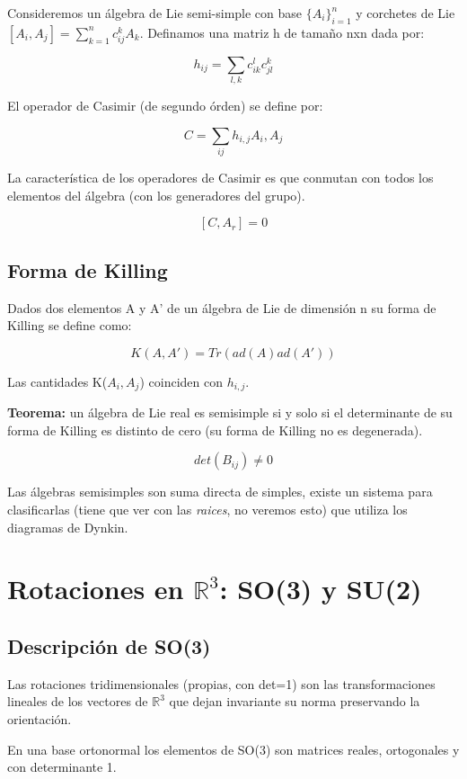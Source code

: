 \documentclass{article}
\begin{document}
      Consideremos un álgebra de Lie semi-simple con base $\lbrace A_i \rbrace _{i=1}^n$ y corchetes de Lie $[A_i,A_j]=\sum _{k=1}^n c_{ij}^k A_k$. Definamos una matriz h de tamaño nxn dada por:

      $$h_{ij}=\sum _{l,k}c^l_{ik}c^k_{jl}$$

      El operador de Casimir (de segundo órden) se define por:

      $$C=\sum _{ij}h_{i,j}A_i,A_j$$

      La característica de los operadores de Casimir es que conmutan con todos los elementos del álgebra (con los generadores del grupo).

      $$[C,A_r]=0$$

     \subsection{Forma de Killing}

     Dados dos elementos A y A' de un álgebra de Lie de dimensión n su forma de Killing se define como:

     $$K(A,A')=Tr(ad(A)ad(A'))$$

     Las cantidades K($A_i,A_j$) coinciden con $h_{i,j}$.

     \textbf{Teorema:} un álgebra de Lie real es semisimple si y solo si el determinante de su forma de Killing es distinto de cero (su forma de Killing no es degenerada).

    $$det(B_{ij})\neq 0$$

    Las álgebras semisimples son suma directa de simples, existe un sistema para clasificarlas (tiene que ver con las \textit{raices}, no veremos esto) que utiliza los diagramas de Dynkin.

     \newpage

     \section{Rotaciones en $\mathds{R}^3$: SO(3) y SU(2)}

     \subsection{Descripción de SO(3)}

     Las rotaciones tridimensionales (propias, con det=1) son las transformaciones lineales de los vectores de $\mathds{R}^3$ que dejan invariante su norma preservando la orientación.

     En una base ortonormal los elementos de SO(3) son matrices reales, ortogonales y con determinante 1.
\end{document}
